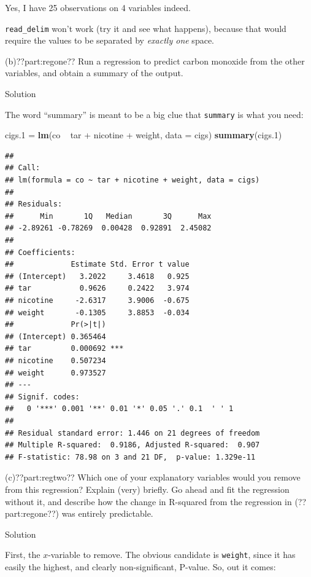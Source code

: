 \documentclass[]{tufte-book}
\newenvironment{Shaded}{}{}
\newcommand{\DataTypeTok}[1]{\textcolor[rgb]{0.56,0.13,0.00}{#1}}
\newcommand{\FloatTok}[1]{\textcolor[rgb]{0.25,0.63,0.44}{#1}}
\newcommand{\KeywordTok}[1]{\textcolor[rgb]{0.00,0.44,0.13}{\textbf{#1}}}
\newcommand{\NormalTok}[1]{#1}
\newcommand{\OperatorTok}[1]{\textcolor[rgb]{0.40,0.40,0.40}{#1}}
\newcommand{\StringTok}[1]{\textcolor[rgb]{0.25,0.44,0.63}{#1}}
\theoremstyle{definition}
\theoremstyle{definition}
\theoremstyle{definition}
\theoremstyle{remark}
\begin{document}
Yes, I have 25 observations on 4 variables indeed.

\texttt{read\_delim} won't work (try it and see what happens), because
that would require the values to be separated by \emph{exactly one}
space.

(b)??part:regone?? Run a regression to predict carbon monoxide from the
other variables, and obtain a summary of the output.

Solution

The word ``summary'' is meant to be a big clue that \texttt{summary} is
what you need:

\begin{Shaded}
\begin{Highlighting}[]
\NormalTok{cigs}\FloatTok{.1}\NormalTok{ =}\StringTok{ }\KeywordTok{lm}\NormalTok{(co }\OperatorTok{~}\StringTok{ }\NormalTok{tar }\OperatorTok{+}\StringTok{ }\NormalTok{nicotine }\OperatorTok{+}\StringTok{ }\NormalTok{weight, }\DataTypeTok{data =}\NormalTok{ cigs)}
\KeywordTok{summary}\NormalTok{(cigs}\FloatTok{.1}\NormalTok{)}
\end{Highlighting}
\end{Shaded}

\begin{verbatim}
## 
## Call:
## lm(formula = co ~ tar + nicotine + weight, data = cigs)
## 
## Residuals:
##      Min       1Q   Median       3Q      Max 
## -2.89261 -0.78269  0.00428  0.92891  2.45082 
## 
## Coefficients:
##             Estimate Std. Error t value
## (Intercept)   3.2022     3.4618   0.925
## tar           0.9626     0.2422   3.974
## nicotine     -2.6317     3.9006  -0.675
## weight       -0.1305     3.8853  -0.034
##             Pr(>|t|)    
## (Intercept) 0.365464    
## tar         0.000692 ***
## nicotine    0.507234    
## weight      0.973527    
## ---
## Signif. codes:  
##   0 '***' 0.001 '**' 0.01 '*' 0.05 '.' 0.1  ' ' 1
## 
## Residual standard error: 1.446 on 21 degrees of freedom
## Multiple R-squared:  0.9186, Adjusted R-squared:  0.907 
## F-statistic: 78.98 on 3 and 21 DF,  p-value: 1.329e-11
\end{verbatim}

(c)??part:regtwo?? Which one of your explanatory variables would you
remove from this regression? Explain (very) briefly. Go ahead and fit
the regression without it, and describe how the change in R-squared from
the regression in (??part:regone??) was entirely predictable.

Solution

First, the \(x\)-variable to remove. The obvious candidate is
\texttt{weight}, since it has easily the highest, and clearly
non-significant, P-value. So, out it comes:
\end{document}
